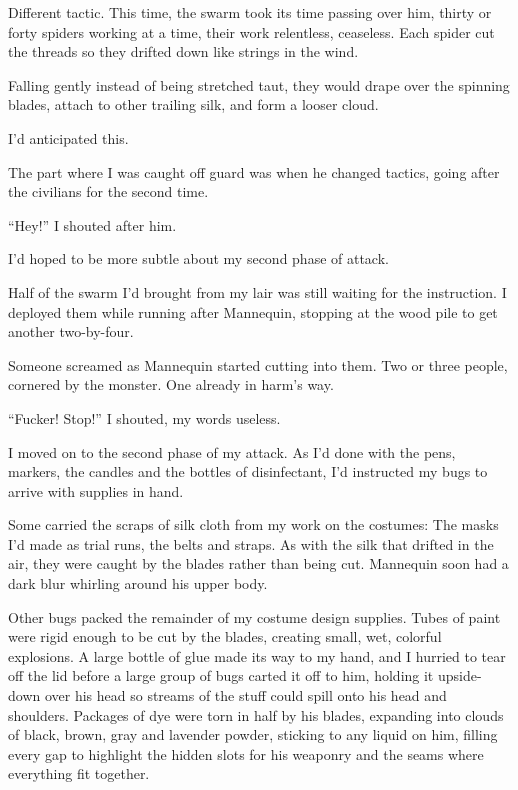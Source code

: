 Different tactic.  This time, the swarm took its time passing over him, thirty or forty spiders working at a time, their work relentless, ceaseless.  Each spider cut the threads so they drifted down like strings in the wind.



Falling gently instead of being stretched taut, they would drape over the spinning blades, attach to other trailing silk, and form a looser cloud.



I'd anticipated this.



The part where I was caught off guard was when he changed tactics, going after the civilians for the second time.



``Hey!'' I shouted after him.



I'd hoped to be more subtle about my second phase of attack.



Half of the swarm I'd brought from my lair was still waiting for the instruction.  I deployed them while running after Mannequin, stopping at the wood pile to get another two-by-four.



Someone screamed as Mannequin started cutting into them.  Two or three people, cornered by the monster.  One already in harm's way.



``Fucker!  Stop!''  I shouted, my words useless.



I moved on to the second phase of my attack.  As I'd done with the pens, markers, the candles and the bottles of disinfectant, I'd instructed my bugs to arrive with supplies in hand.



Some carried the scraps of silk cloth from my work on the costumes: The masks I'd made as trial runs, the belts and straps.  As with the silk that drifted in the air, they were caught by the blades rather than being cut.  Mannequin soon had a dark blur whirling around his upper body.



Other bugs packed the remainder of my costume design supplies.  Tubes of paint were rigid enough to be cut by the blades, creating small, wet, colorful explosions.  A large bottle of glue made its way to my hand, and I hurried to tear off the lid before a large group of bugs carted it off to him, holding it upside-down over his head so streams of the stuff could spill onto his head and shoulders.  Packages of dye were torn in half by his blades, expanding into clouds of black, brown, gray and lavender powder, sticking to any liquid on him, filling every gap to highlight the hidden slots for his weaponry and the seams where everything fit together.




